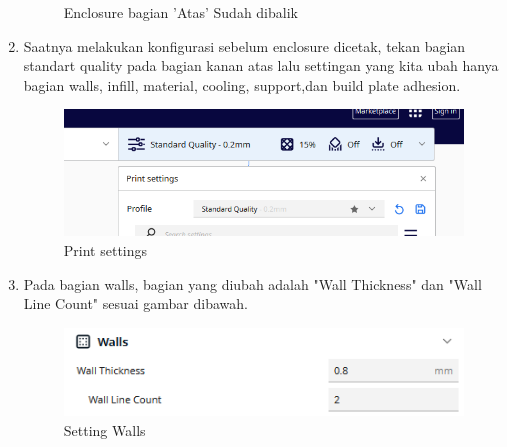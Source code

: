 \begin{enumerate}
\begin{figure}[H]
       \caption{Enclosure bagian 'Atas' Sudah dibalik}
       \label{fig:Enclosure}
   \end{figure}
    \item Saatnya melakukan konfigurasi sebelum enclosure dicetak, tekan bagian standart quality pada bagian kanan atas 
    lalu settingan yang kita ubah hanya bagian walls, infill, material, cooling, support,dan build plate adhesion.
    \begin{figure}[H]
        \centering
        \includegraphics[width=0.5\linewidth]{P3/img/settings.png}
        \caption{Print settings}
        \label{fig:Settings}
    \end{figure}
    \item Pada bagian walls, bagian yang diubah adalah "Wall Thickness" dan "Wall Line Count" sesuai gambar dibawah. 
    \begin{figure}[H]
        \centering
        \includegraphics[width=0.5\linewidth]{P3/img/Setting walls.png}
        \caption{Setting Walls}
        \label{fig:Settings walls}
    \end{figure}


\end{enumerate}

